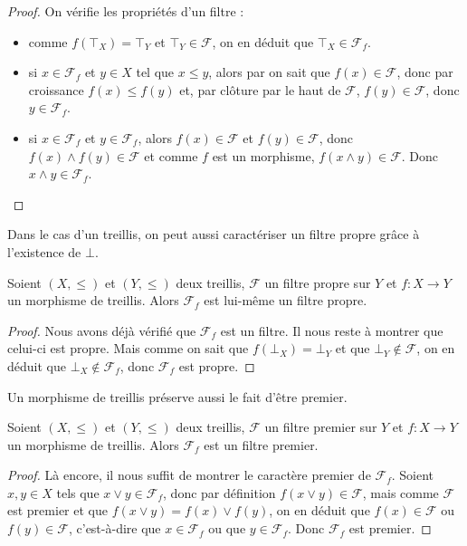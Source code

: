 \begin{proof}
  On vérifie les propriétés d'un filtre :
  \begin{itemize}
  \item comme $f(\top_X) = \top_Y$ et $\top_Y \in \mathcal F$, on en déduit que
    $\top_X\in\mathcal F_f$.
  \item si $x\in \mathcal F_f$ et $y\in X$ tel que $x\leq y$, alors par
    on sait que $f(x)\in\mathcal F$, donc par croissance $f(x)\leq f(y)$ et,
    par clôture par le haut de $\mathcal F$, $f(y)\in \mathcal F$, donc
    $y\in \mathcal F_f$.
  \item si $x\in \mathcal F_f$ et $y\in\mathcal F_f$, alors $f(x)\in\mathcal F$
    et $f(y)\in\mathcal F$, donc $f(x)\land f(y)\in\mathcal F$ et comme
    $f$ est un morphisme, $f(x\land y)\in\mathcal F$. Donc
    $x\land y\in\mathcal F_f$.
  \end{itemize}
\end{proof}

Dans le cas d'un treillis, on peut aussi caractériser un filtre propre grâce à
l'existence de $\bot$.

\begin{property}
  Soient $(X,\leq)$ et $(Y,\leq)$ deux treillis, $\mathcal F$ un filtre propre
  sur $Y$ et $f : X \to Y$ un morphisme de treillis. Alors $\mathcal F_f$ est
  lui-même un filtre propre.
\end{property}

\begin{proof}
  Nous avons déjà vérifié que $\mathcal F_f$ est un filtre. Il nous reste à
  montrer que celui-ci est propre. Mais comme on sait que $f(\bot_X)=\bot_Y$
  et que $\bot_Y\notin\mathcal F$, on en déduit que $\bot_X\notin\mathcal F_f$,
  donc $\mathcal F_f$ est propre.
\end{proof}

Un morphisme de treillis préserve aussi le fait d'être premier.

\begin{property}
  Soient $(X,\leq)$ et $(Y,\leq)$ deux treillis, $\mathcal F$ un filtre premier
  sur $Y$ et $f : X \to Y$ un morphisme de treillis. Alors $\mathcal F_f$ est un
  filtre premier.
\end{property}

\begin{proof}
  Là encore, il nous suffit de montrer le caractère premier de $\mathcal F_f$.
  Soient $x,y\in X$ tels que $x\lor y \in \mathcal F_f$, donc par définition
  $f(x\lor y)\in \mathcal F$, mais comme $\mathcal F$ est premier et que
  $f(x\lor y) = f(x)\lor f(y)$, on en déduit que $f(x)\in\mathcal F$ ou
  $f(y)\in\mathcal F$, c'est-à-dire que $x\in\mathcal F_f$ ou que
  $y\in\mathcal F_f$. Donc $\mathcal F_f$ est premier.
\end{proof}


